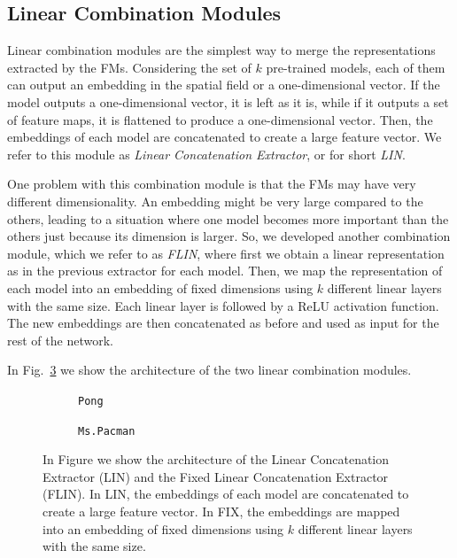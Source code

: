 \subsection{Linear Combination Modules}
\label{sec:linear_combination}
Linear combination modules are the simplest way to merge the representations extracted by the FMs.
Considering the set of $k$ pre-trained models, each of them can output an embedding in the spatial field or a one-dimensional vector.
If the model outputs a one-dimensional vector, it is left as it is, while if it outputs a set of feature maps, it is flattened to produce a one-dimensional vector.
Then, the embeddings of each model are concatenated to create a large feature vector.
We refer to this module as \textit{Linear Concatenation Extractor}, or for short \textit{LIN}.


One problem with this combination module is that the FMs may have very different dimensionality.
An embedding might be very large compared to the others, leading to a situation where one model becomes more important than the others just because its dimension is larger.
So, we developed another combination module, which we refer to as \textit{FLIN}, where first we obtain a linear representation as in the previous extractor for each model.
Then, we map the representation of each model into an embedding of fixed dimensions using $k$ different linear layers with the same size.
Each linear layer is followed by a ReLU activation function.
The new embeddings are then concatenated as before and used as input for the rest of the network.

In Fig.~\ref{fig:lin_combination} we show the architecture of the two linear combination modules.


\begin{figure}[ht]
    \centering
    \begin{subfigure}[b]{0.47\textwidth}
        \centering
        \fbox{\rule[-.5cm]{0cm}{4cm} \rule[-.5cm]{4cm}{0cm}}
        \caption{\texttt{Pong}}
        \label{fig:lin}
    \end{subfigure}
    \hfill
    \begin{subfigure}[b]{0.47\textwidth}
        \centering
        \fbox{\rule[-.5cm]{0cm}{4cm} \rule[-.5cm]{4cm}{0cm}}
        \caption{\texttt{Ms.Pacman}}
        \label{fig:fix_lin}
    \end{subfigure}

    \caption{In Figure we show the architecture of the Linear Concatenation Extractor (LIN) and the Fixed Linear Concatenation Extractor (FLIN). In LIN, the embeddings of each model are concatenated to create a large feature vector. In FIX, the embeddings are mapped into an embedding of fixed dimensions using $k$ different linear layers with the same size.}
    \label{fig:lin_combination}
\end{figure}




